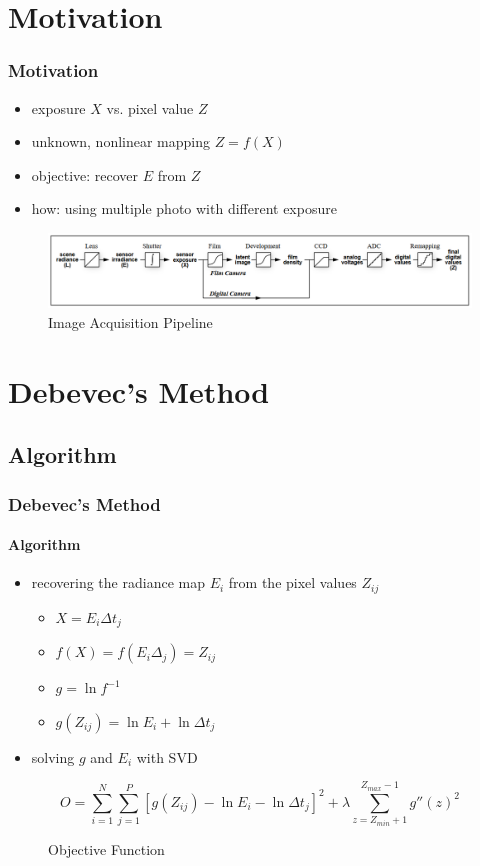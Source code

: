 \documentclass[
	11pt, %
	aspectratio=169, %
]{beamer}
\begin{document}
\section{Motivation}

\begin{frame}
	\frametitle{Motivation}

	\begin{itemize}
		\item exposure $X$ vs. pixel value $Z$
		\item unknown, nonlinear mapping $Z = f(X)$
		\item objective: recover $E$ from $Z$
		\item how: using multiple photo with different exposure
	\end{itemize}
	
	\begin{figure}
		\includegraphics[width=0.9\linewidth]{./Images/camera_pipeline.png}
		\caption{Image Acquisition Pipeline}
	\end{figure}

\end{frame}

\section{Debevec's Method}
\subsection{Algorithm}

\begin{frame}
	\frametitle{Debevec's Method}
	\framesubtitle{Algorithm}

	\begin{itemize}
		\item recovering the radiance map $E_i$ from the pixel values $Z_{ij}$
		\begin{itemize} 
			\item $X = E_i \Delta t_j$
			\item $f(X) = f(E_i \Delta_j) = Z_{ij}$
			\item $g = \ln f^{-1}$
			\item $g(Z_{ij}) = \ln E_i + \ln \Delta t_j$
		\end{itemize}
		\item solving $g$ and $E_i$ with SVD
	\end{itemize}

	\begin{figure}
		$$O = \sum _{i=1}^{N} \sum_{j=1}^{P} \left[g(Z_{ij}) - \ln E_i - \ln \Delta t_j\right]^{2} 
			+ \lambda \sum_{z = Z_{min} + 1}^{Z_{max} - 1} g''(z)^{2}$$
		\caption{Objective Function}
	\end{figure}
\end{frame}
\end{document}
